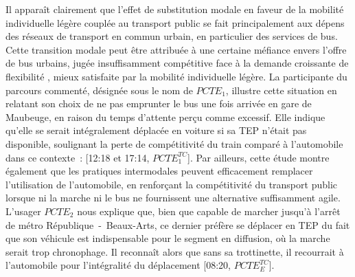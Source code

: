 \begin{refsegment}
Il apparaît clairement que l'effet de substitution modale en faveur de la mobilité individuelle légère couplée au transport public se fait principalement aux dépens des réseaux de transport en commun urbain, en particulier des services de bus. Cette transition modale peut être attribuée à une certaine méfiance envers l'offre de bus urbains, jugée insuffisamment compétitive face à la demande croissante de flexibilité \textcolor{blue}{\autocite[19-24]{bauman_liquid_2000}}, mieux satisfaite par la mobilité individuelle légère. La participante du parcours commenté, désignée sous le nom de \(PCTE_{1}\), illustre cette situation en relatant son choix de ne pas emprunter le bus une fois arrivée en gare de Maubeuge, en raison du temps d'attente perçu comme excessif. Elle indique qu'elle se serait intégralement déplacée en voiture si sa \acrshort{TEP} n'était pas disponible, soulignant la perte de compétitivité du train comparé à l'automobile dans ce contexte~:  [12:18 et 17:14, \(PCTE^{TC}_{1}\)]. Par ailleurs, cette étude montre également que les pratiques intermodales peuvent efficacement remplacer l'utilisation de l'automobile, en renforçant la compétitivité du transport public lorsque ni la marche ni le bus ne fournissent une alternative suffisamment agile. L'usager \(PCTE_{2}\) nous explique que, bien que capable de marcher jusqu'à l'arrêt de métro République~-~Beaux-Arts, ce dernier préfère se déplacer en \acrshort{TEP} du fait que son véhicule est indispensable pour le segment en diffusion, où la marche serait trop chronophage. Il reconnaît alors que sans sa trottinette, il recourrait à l'automobile pour l'intégralité du déplacement [08:20, \(PCTE^{TC}_{E}\)].%


\end{refsegment}
